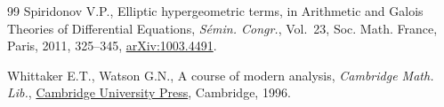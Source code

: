 \documentclass[pdftex]{sigma}
\numberwithin{equation}{section}
\theoremstyle{definition}
\begin{document}
\begin{thebibliography}{99}
Spiridonov V.P., Elliptic hypergeometric terms, in Arithmetic and {G}alois
 {T}heories of {D}ifferential {E}quations, \textit{S\'emin. Congr.}, Vol.~23,
 Soc. Math. France, Paris, 2011, 325--345,
 \href{http://arxiv.org/abs/1003.4491}{arXiv:1003.4491}.

Whittaker E.T., Watson G.N., A course of modern analysis, \textit{Cambridge Math. Lib.},
 \href{https://doi.org/10.1017/CBO9780511608759}{Cambridge University Press},
 Cambridge, 1996.

\end{thebibliography}\LastPageEnding
\end{document}
